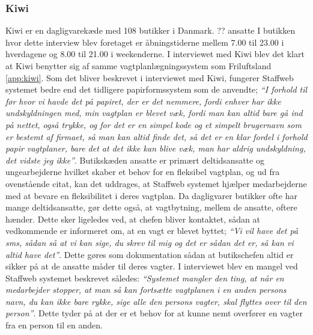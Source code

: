 \subsubsection{Kiwi}
Kiwi er en dagligvarekæde med 108 butikker i Danmark. ?? ansatte I butikken hvor dette interview blev foretaget er åbningstiderne mellem 7.00 til 23.00 i hverdagene og 8.00 til 21.00 i weekenderne. %
I interviewet med Kiwi blev det klart at Kiwi benytter sig af samme vagtplanlægningssystem som Friluftsland \ref{app:kiwi}. Som det bliver beskrevet i interviewet med Kiwi, fungerer Staffweb systemet bedre end det tidligere papirformssystem som de anvendte;\textit{ “I forhold til før hvor vi havde det på papiret, der er det nemmere, fordi enhver har ikke undskyldningen med, min vagtplan er blevet væk, fordi man kan altid bare gå ind på nettet, også trykke, og for det er en simpel kode og et simpelt brugernavn som er bestemt af firmaet, så man kan altid finde det, så det er en klar fordel i forhold papir vagtplaner, bare det at det ikke kan blive væk, man har aldrig undskyldning, det vidste jeg ikke”}. Butikskæden ansatte er primært deltidsansatte og ungearbejderne hvilket skaber et behov for en fleksibel vagtplan, og ud fra ovenstående citat, kan det uddrages, at Staffweb systemet hjælper medarbejderne med at bevare en fleksibilitet i deres vagtplan. Da dagligvarer butikker ofte har mange deltidsansatte, gør dette også, at vagtbytning, mellem de ansatte, oftere hænder. Dette sker ligeledes ved, at chefen bliver kontaktet, sådan at vedkommende er informeret om, at en vagt er blevet byttet;\textit{ “Vi vil have det på sms, sådan så at vi kan sige, du skrev til mig og det er sådan det er, så kan vi altid have det”}. Dette gøres som dokumentation sådan at butikschefen altid er sikker på at de ansatte måder til deres vagter.
I interviewet blev en mangel ved Staffweb systemet beskrevet således: \textit{“Systemet mangler den ting, at når en medarbejder stopper, at man så kan fortsætte vagtplanen i en anden persons navn, du kan ikke bare rykke, sige alle den persons vagter, skal flyttes over til den person”}. Dette tyder på at der er et behov for at kunne nemt overfører en vagter fra en person til en anden.

